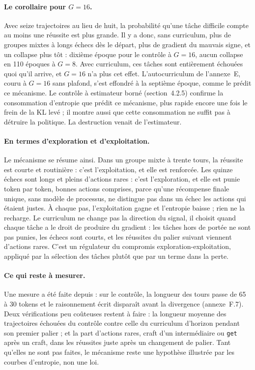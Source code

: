 \documentclass[11pt,a4paper]{article}
\begin{document}
\paragraph{Le corollaire pour $G=16$.} Avec seize trajectoires au lieu de huit, la probabilité qu'une tâche difficile compte au moins une réussite est plus grande. Il y a donc, sans curriculum, plus de groupes mixtes à longs échecs dès le départ, plus de gradient du mauvais signe, et un collapse plus tôt : dixième époque pour le contrôle à $G=16$, aucun collapse en 110 époques à $G=8$. Avec curriculum, ces tâches sont entièrement échouées quoi qu'il arrive, et $G=16$ n'a plus cet effet. L'autocurriculum de l'annexe~E, couru à $G=16$ sans plafond, s'est effondré à la septième époque, comme le prédit ce mécanisme. Le contrôle à estimateur borné (section~4.2.5) confirme la consommation d'entropie que prédit ce mécanisme, plus rapide encore une fois le frein de la KL levé ; il montre aussi que cette consommation ne suffit pas à détruire la politique. La destruction venait de l'estimateur.

\paragraph{En termes d'exploration et d'exploitation.} Le mécanisme se résume ainsi. Dans un groupe mixte à trente tours, la réussite est courte et routinière : c'est l'exploitation, et elle est renforcée. Les quinze échecs sont longs et pleins d'actions rares : c'est l'exploration, et elle est punie token par token, bonnes actions comprises, parce qu'une récompense finale unique, sans modèle de processus, ne distingue pas dans un échec les actions qui étaient justes. À chaque pas, l'exploitation gagne et l'entropie baisse ; rien ne la recharge. Le curriculum ne change pas la direction du signal, il choisit quand chaque tâche a le droit de produire du gradient : les tâches hors de portée ne sont pas punies, les échecs sont courts, et les réussites du palier suivant viennent d'actions rares. C'est un régulateur du compromis exploration-exploitation, appliqué par la sélection des tâches plutôt que par un terme dans la perte.


\paragraph{Ce qui reste à mesurer.} Une mesure a été faite depuis : sur le contrôle, la longueur des tours passe de 65 à 30 tokens et le raisonnement écrit disparaît avant la divergence (annexe~F.7). Deux vérifications peu coûteuses restent à faire : la longueur moyenne des trajectoires échouées du contrôle contre celle du curriculum d'horizon pendant son premier palier ; et la part d'actions rares, craft d'un intermédiaire ou \texttt{get} après un craft, dans les réussites juste après un changement de palier. Tant qu'elles ne sont pas faites, le mécanisme reste une hypothèse illustrée par les courbes d'entropie, non une loi.
\end{document}
